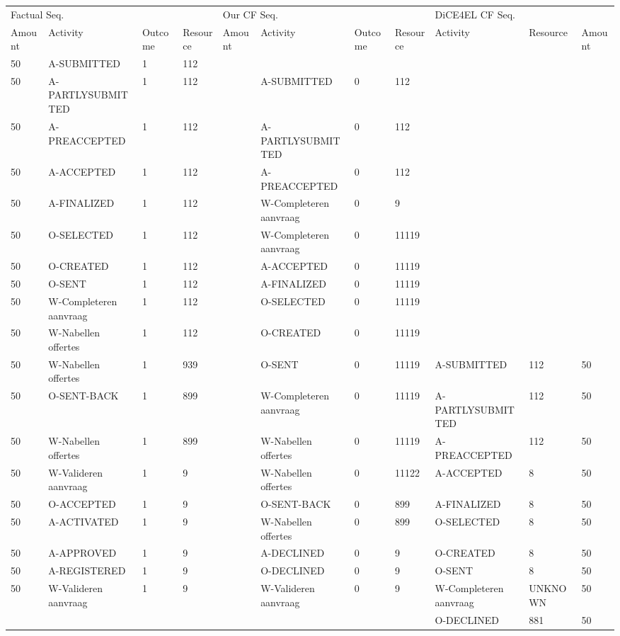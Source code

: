 \begin{tabular}{lllllllllll}
\toprule
\multicolumn{4}{l}{Factual Seq.} & \multicolumn{4}{l}{Our CF Seq.} & \multicolumn{3}{l}{DiCE4EL CF Seq.} \\
Amount & Activity & Outcome & Resource & Amount & Activity & Outcome & Resource & Activity & Resource & Amount \\
\midrule
50 & A-SUBMITTED & 1 & 112 &  &  &  &  &  &  &  \\
50 & A-PARTLYSUBMITTED & 1 & 112 &  & A-SUBMITTED & 0 & 112 &  &  &  \\
50 & A-PREACCEPTED & 1 & 112 &  & A-PARTLYSUBMITTED & 0 & 112 &  &  &  \\
50 & A-ACCEPTED & 1 & 112 &  & A-PREACCEPTED & 0 & 112 &  &  &  \\
50 & A-FINALIZED & 1 & 112 &  & W-Completeren aanvraag & 0 & 9 &  &  &  \\
50 & O-SELECTED & 1 & 112 &  & W-Completeren aanvraag & 0 & 11119 &  &  &  \\
50 & O-CREATED & 1 & 112 &  & A-ACCEPTED & 0 & 11119 &  &  &  \\
50 & O-SENT & 1 & 112 &  & A-FINALIZED & 0 & 11119 &  &  &  \\
50 & W-Completeren aanvraag & 1 & 112 &  & O-SELECTED & 0 & 11119 &  &  &  \\
50 & W-Nabellen offertes & 1 & 112 &  & O-CREATED & 0 & 11119 &  &  &  \\
50 & W-Nabellen offertes & 1 & 939 &  & O-SENT & 0 & 11119 & A-SUBMITTED & 112 & 50 \\
50 & O-SENT-BACK & 1 & 899 &  & W-Completeren aanvraag & 0 & 11119 & A-PARTLYSUBMITTED & 112 & 50 \\
50 & W-Nabellen offertes & 1 & 899 &  & W-Nabellen offertes & 0 & 11119 & A-PREACCEPTED & 112 & 50 \\
50 & W-Valideren aanvraag & 1 & 9 &  & W-Nabellen offertes & 0 & 11122 & A-ACCEPTED & 8 & 50 \\
50 & O-ACCEPTED & 1 & 9 &  & O-SENT-BACK & 0 & 899 & A-FINALIZED & 8 & 50 \\
50 & A-ACTIVATED & 1 & 9 &  & W-Nabellen offertes & 0 & 899 & O-SELECTED & 8 & 50 \\
50 & A-APPROVED & 1 & 9 &  & A-DECLINED & 0 & 9 & O-CREATED & 8 & 50 \\
50 & A-REGISTERED & 1 & 9 &  & O-DECLINED & 0 & 9 & O-SENT & 8 & 50 \\
50 & W-Valideren aanvraag & 1 & 9 &  & W-Valideren aanvraag & 0 & 9 & W-Completeren aanvraag & UNKNOWN & 50 \\
 &  &  &  &  &  &  &  & O-DECLINED & 881 & 50 \\
\bottomrule
\end{tabular}
